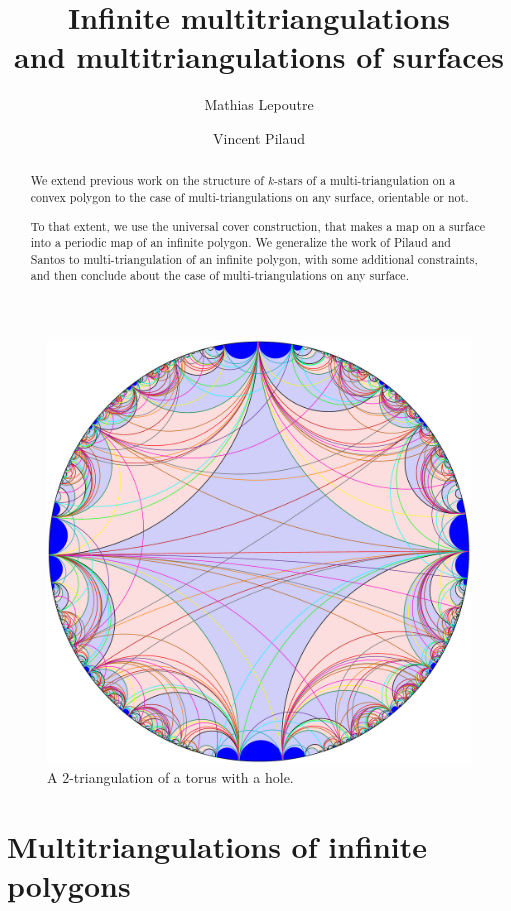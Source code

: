 \documentclass{amsart}
\title[Infinite multitriangulations and multitriangulations of surfaces]{Infinite multitriangulations \\ and multitriangulations of surfaces}
\author{Mathias Lepoutre}
\author{Vincent Pilaud}
\theoremstyle{remark}
\begin{document}
\begin{abstract}
We extend previous work on the structure of $k$-stars of a multi-triangulation on a convex polygon to the case of multi-triangulations on any surface, orientable or not. 

To that extent, we use the universal cover construction, that makes a map on a surface into a periodic map of an infinite polygon. We generalize the work of Pilaud and Santos to multi-triangulation of an infinite polygon, with some additional constraints, and then conclude about the case of multi-triangulations on any surface.
\end{abstract}

\maketitle

\begin{figure}[h]
	\capstart
	\centerline{\includegraphics[scale=.42]{torus}}
	\caption{A $2$-triangulation of a torus with a hole.}
	\label{fig:torus}
\end{figure}


\section{Multitriangulations of infinite polygons}
\end{document}
